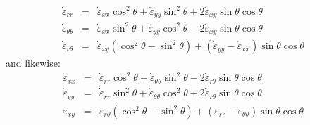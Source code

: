 \begin{eqnarray}
\dot{\varepsilon}_{rr} 
&=& \dot{\varepsilon}_{xx} \cos^2\theta + \dot{\varepsilon}_{yy} \sin^2\theta 
+ 2 \dot{\varepsilon}_{xy} \sin\theta\cos\theta \\
\dot{\varepsilon}_{\theta\theta}
&=& \dot{\varepsilon}_{xx} \sin^2\theta + \dot{\varepsilon}_{yy} \cos^2\theta 
- 2 \dot{\varepsilon}_{xy} \sin\theta\cos\theta \\
\dot{\varepsilon}_{r\theta} 
&=& \dot{\varepsilon}_{xy} (\cos^2\theta-\sin^2\theta) + 
(\dot{\varepsilon}_{yy} - \dot{\varepsilon}_{xx})\sin\theta \cos\theta
\end{eqnarray}
and likewise:
\begin{eqnarray}
\dot{\varepsilon}_{xx} 
&=& \dot{\varepsilon}_{rr} \cos^2\theta + \dot{\varepsilon}_{\theta\theta} \sin^2\theta - 2 \dot{\varepsilon}_{r\theta} \sin\theta\cos\theta \\
\dot{\varepsilon}_{yy}
&=& \dot{\varepsilon}_{rr} \sin^2\theta + \dot{\varepsilon}_{\theta\theta} \cos^2\theta + 2 \dot{\varepsilon}_{r\theta} \sin\theta\cos\theta \\
\dot{\varepsilon}_{xy} 
&=& \dot{\varepsilon}_{r\theta} (\cos^2\theta-\sin^2\theta) + 
(\dot{\varepsilon}_{rr} - \dot{\varepsilon}_{\theta\theta})\sin\theta \cos\theta \label{ss:srboth}
\end{eqnarray}
















